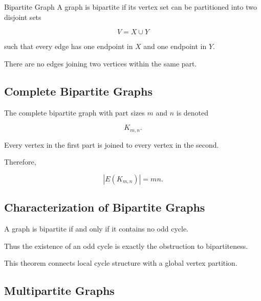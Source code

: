 \begin{definitionbox}{Bipartite Graph}
A graph is bipartite if its vertex set can be partitioned into two
disjoint sets

\[
V=X\cup Y
\]

such that every edge has one endpoint in \(X\) and one endpoint in
\(Y\).
\end{definitionbox}

There are no edges joining two vertices within the same part.

\subsection{Complete Bipartite Graphs}
\label{subsec:complete-bipartite-graphs}

The complete bipartite graph with part sizes \(m\) and \(n\) is denoted

\[
\boxed{
K_{m,n}.
}
\]

Every vertex in the first part is joined to every vertex in the second.

Therefore,

\[
\boxed{
|E(K_{m,n})|=mn.
}
\]

\subsection{Characterization of Bipartite Graphs}
\label{subsec:bipartite-characterization}

\begin{theorem}
A graph is bipartite if and only if it contains no odd cycle.
\end{theorem}

Thus the existence of an odd cycle is exactly the obstruction to
bipartiteness.

This theorem connects local cycle structure with a global vertex
partition.

\subsection{Multipartite Graphs}
\label{subsec:multipartite-graphs}

